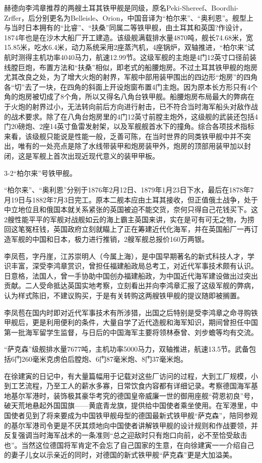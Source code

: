 \documentclass[12pt,UTF8]{ctexbook}
\begin{document}
赫德向李鸿章推荐的两艘土耳其铁甲舰是同级，原名Peki-Shereef、Boordhi-Zrffer，后分别更名为Belleisle、Orion，中国音译为“柏尔来”、“奥利恩”。舰型上与当时日本拥有的“比睿”、“扶桑”同属二等铁甲舰，由土耳其和英国?作设计，1874年也是在沙木大船厂开工建造。该级舰满载排水量4870吨，舰长74.68米，宽15.85米，吃水6.4米，动力系统采用2座蒸汽机，4座锅炉，双轴推进，“柏尔来”试航时测得主机功率4040马力，航速12.99节。这级军舰的主炮是4门12英寸口径前装线膛巨炮，布置方法和“扶桑”相似，即老式的船腰炮房。不过土耳其铁甲舰的炮房尤其改良之处，为了增大火炮的射界，军舰中部用装甲围出的四边形“炮房”的四角各“切”去了一块，在四角的斜面上开设炮窗布置4门主炮。因为原本长方形只有4个角的炮房被切成了8个角，所以又得名八角台铁甲舰。船腰炮房布局最大的弊病在于火炮的射界过小，无法转向前后方向进行射击，已不符合当时海军船头对敌作战的战术要求。除了在八角台炮房里的4门12英寸前膛主炮外，这级舰的武装还包括4门20磅炮、2座14英寸鱼雷发射架，以及军舰舰首水下的撞角。综合各项技术指标来看，该级舰只能说是性能一般，乏善可陈，在当时世界的同类铁甲舰中并不突出，唯有的一处亮点是除了水线带装甲和炮房装甲外，炮房的顶部用装甲加以封闭，这是军舰上首次出现近现代意义的装甲甲板。

3-2“柏尔来”号铁甲舰。

“柏尔来”、“奥利恩”分别于1876年2月12日、1879年1月23日下水，最后在1878年7月19日与1882年7月3日完工。原本二舰本应由土耳其接收，但正值俄土战争，处于中立地位且和俄国本就关系紧张的英国被迫不能交货，奈何只得自己花钱买下。这2艘性能平平的军舰对战舰如云的海上霸主英国来讲，实在是可有可无之物，为捞回这笔冤枉钱，英国政府立刻就瞄上了正在筹建近代化海军，并在英国船厂一再订造军舰的中国和日本，极力进行推销，2艘军舰总报价160万两银。

李凤苞，字丹崖，江苏崇明人（今属上海），是中国早期著名的新式科技人才，学识丰富，深受李鸿章赏识，曾担任福建船政局总考工，对近代军事技术颇有认识。日意格，法国人，曾一手协助中国创办福建船政，为中国近代海军建设做出过突出贡献。二人受命抵达英国实地考察，立刻看出并向李鸿章汇报了这级军舰的弊病，认为样式陈旧，不建议购买，于是有关转购这两艘铁甲舰的提议随即被搁置。

李凤苞在国内时即对近代军事技术有所涉猎，出国之后特别是受李鸿章之命寻购铁甲舰后，更是利用便利的条件，大量自学了近代造舰和海军知识，期间曾担任中国第一批海军留学生监督，与日后的中国海军主要将领林泰曾、刘步蟾等均有交流。

“萨克森”级舰排水量7677吨，主机功率5000马力，双轴推进，航速13.5节。武备包括6门260毫米克虏伯后膛炮、6门87毫米炮、8门37毫米炮。

在徐建寅的日记中，有大量篇幅用于记载对这些厂访问的过程，大到工厂规模，小到工艺流程，乃至工人的薪水多寡，日常饮食内容都有详细记录。考察德国海军基地基尔军港时，装饰极其豪华考究的德国皇帝威廉一世的御用座舰“荷恩初良”号，破天荒地悬起外国国旗——黄底青龙旗，提供给中国使者乘坐使用。在军港里，中国使者见到了将来要成为中国铁甲舰母型的德国最新式铁甲舰“萨克森”，陪同参观的基尔军港司令更是不厌其烦地向中国使者讲解铁甲舰的设计规则和作战要领，并反复强调当时海军战术的一条准则“总之迎敌时只有炮口向前，必不至恰受敌击也”。当然这位德国将军肯定不会忘了自己国家的生意，在向徐建寅一一介绍自己的妻子儿女以示亲近的同时，对德国的新式铁甲舰“萨克森”更是大加溢美。
\end{document}
